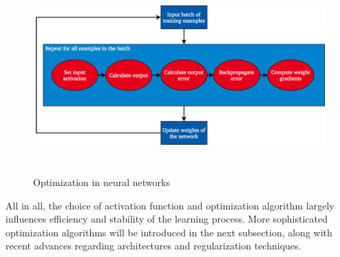\begin{figure}[h]
  \includegraphics[height=7.5cm]{img/nn_optimization_3}
  \caption{Optimization in neural networks}
\label{fig:grad_desc}
\end{figure}

All in all, the choice of activation function and optimization algorithm largely
influences efficiency and stability of the learning process.
More sophisticated optimization algorithms will be introduced in the next
subsection, along with recent advances regarding architectures and
regularization techniques.
